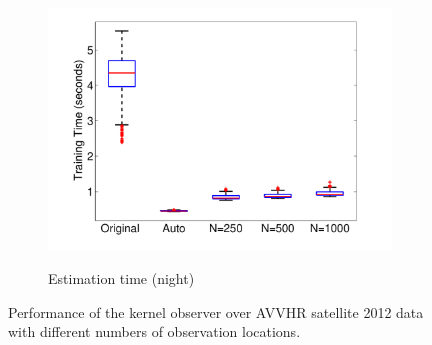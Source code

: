 \documentclass[letterpaper,12pt,peerreviewca,draftcls]{IEEEtran}
\begin{document}
\begin{figure}
\begin{subfigure}[t]{0.41\textwidth}
		\includegraphics[width=\linewidth]{"Figure 13h"}
		\label{fig:pathfinder_tr_times_boxplots_night}
		\caption{Estimation time (night)}
	\end{subfigure}	
	\caption{Performance of the kernel observer over AVVHR satellite 2012 data with different numbers of observation locations.}
\end{figure}
\end{document}
